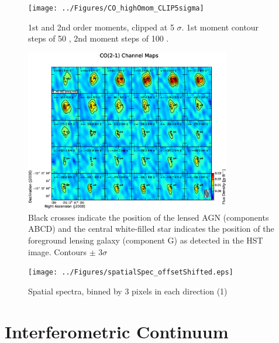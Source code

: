\begin{figure}[tbph]
\centering
\texttt{[image: ../Figures/CO\_highOmom\_CLIP5sigma]}
\caption{
1st and 2nd order moments, clipped at 5 $\sigma$. 1st moment contour steps of 50 \kms, 2nd moment steps of 100 \kms.
 \label{fig:highOmoments}}
\end{figure}




\begin{figure}[tbph]
\centering
\includegraphics[width=0.8\textwidth]{../Figures/co_channel_maps.eps}	 %
\caption{
Black crosses indicate the position of the lensed AGN (components ABCD) and the central white-filled star indicates the
position of the foreground lensing galaxy (component G) as detected in the HST image. Contours $\pm$ 3$\sigma$
 \label{fig:chanmap}}
\end{figure}

\begin{figure}[tbph]
\centering
\texttt{[image: ../Figures/spatialSpec\_offsetShifted.eps]}
\caption{
Spatial spectra, binned by 3 pixels in each direction (1)
 \label{fig:spatialSpec}}
\end{figure}



\section{Interferometric Continuum}
%
%
%


